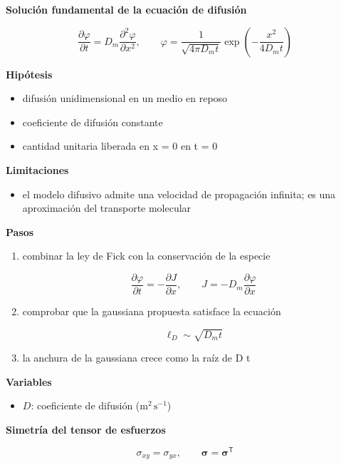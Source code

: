 \documentclass[10pt,openany]{book}
\begin{document}
\begin{tcolorbox}[title={Desarrollos del modelo}, studiumdef, breakable]

\noindent\textbf{Solución fundamental de la ecuación de difusión}

\[
\frac{\partial\varphi}{\partial t} = D_m\frac{\partial^{2}\varphi}{\partial x^{2}},\qquad \varphi = \frac{1}{\sqrt{4\pi D_m t}}\exp\!\left(-\frac{x^{2}}{4D_m t}\right)
\]

\noindent\textbf{Hipótesis}
\begin{itemize}
\item difusión unidimensional en un medio en reposo
\item coeficiente de difusión constante
\item cantidad unitaria liberada en x = 0 en t = 0
\end{itemize}

\noindent\textbf{Limitaciones}
\begin{itemize}
\item el modelo difusivo admite una velocidad de propagación infinita; es una aproximación del transporte molecular
\end{itemize}

\noindent\textbf{Pasos}
\begin{enumerate}
\item
combinar la ley de Fick con la conservación de la especie

\[
\frac{\partial\varphi}{\partial t} = -\frac{\partial J}{\partial x},\qquad J = -D_m\frac{\partial\varphi}{\partial x}
\]
\item
comprobar que la gaussiana propuesta satisface la ecuación

\[
\ell_D \sim \sqrt{D_m t}
\]
\item
la anchura de la gaussiana crece como la raíz de D t
\end{enumerate}

\noindent\textbf{Variables}
\begin{itemize}
\item $D$: coeficiente de difusión ($\mathrm{m}^{2}\,\mathrm{s}^{-1}$)
\end{itemize}



\noindent\textbf{Simetría del tensor de esfuerzos}

\begin{equation}
\sigma_{xy} = \sigma_{yx},\qquad \boldsymbol{\sigma} = \boldsymbol{\sigma}^{\mathsf{T}}
\label{eq:c13-simetria}
\end{equation}


\end{tcolorbox}
\end{document}
